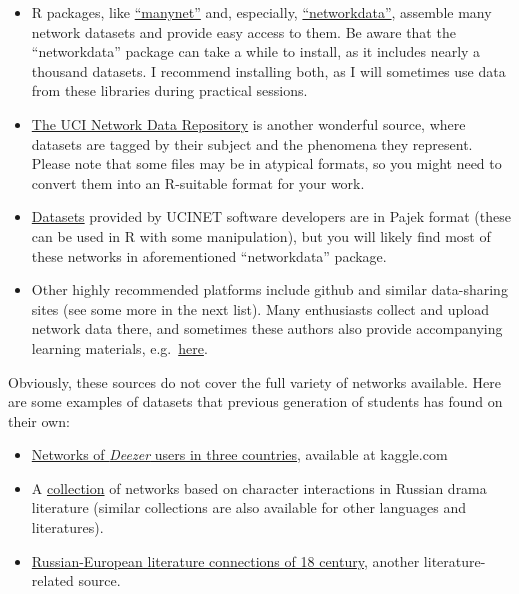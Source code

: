 \documentclass[
]{book}
\begin{document}
\begin{itemize}
\item
  R packages, like \href{https://cran.r-project.org/web/packages/manynet/manynet.pdf}{``manynet''} and, especially, \href{https://schochastics.github.io/networkdata/}{``networkdata''}, assemble many network datasets and provide easy access to them. Be aware that the ``networkdata'' package can take a while to install, as it includes nearly a thousand datasets. I recommend installing both, as I will sometimes use data from these libraries during practical sessions.
\item
  \href{https://networkdata.ics.uci.edu/index.html}{The UCI Network Data Repository} is another wonderful source, where datasets are tagged by their subject and the phenomena they represent. Please note that some files may be in atypical formats, so you might need to convert them into an R-suitable format for your work.
\item
  \href{https://sites.google.com/site/ucinetsoftware/datasets}{Datasets} provided by UCINET software developers are in Pajek format (these can be used in R with some manipulation), but you will likely find most of these networks in aforementioned ``networkdata'' package.
\item
  Other highly recommended platforms include github and similar data-sharing sites (see some more in the next list). Many enthusiasts collect and upload network data there, and sometimes these authors also provide accompanying learning materials, e.g.~\href{https://github.com/JeffreyAlanSmith/Integrated_Network_Science/tree/master/data}{here}.
\end{itemize}

Obviously, these sources do not cover the full variety of networks available. Here are some examples of datasets that previous generation of students has found on their own:

\begin{itemize}
\item
  \href{https://www.kaggle.com/datasets/andreagarritano/deezer-social-networks}{Networks of \emph{Deezer} users in three countries}, available at kaggle.com
\item
  A \href{https://dracor.org/rus}{collection} of networks based on character interactions in Russian drama literature (similar collections are also available for other languages and literatures).
\item
  \href{https://dataverse.pushdom.ru/dataset.xhtml?persistentId=doi:10.31860/openlit-2023.4-B003}{Russian-European literature connections of 18 century}, another literature-related source.
\end{itemize}
\end{document}
